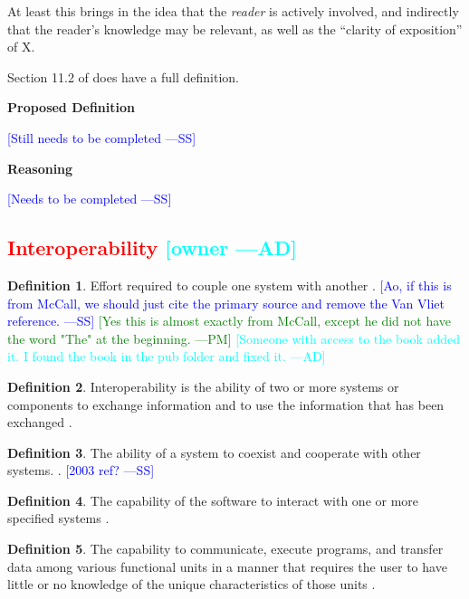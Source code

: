 \documentclass[letterpaper, cleveref]{lipics-v2019}
\newcommand{\authornote}[3]{\textcolor{#1}{[#3 ---#2]}}
\newcommand{\authornote}[3]{}
\newcommand{\wss}[1]{\authornote{blue}{SS}{#1}} %
\newcommand{\pmi}[1]{\authornote{green}{PM}{#1}} %
\newcommand{\ad}[1]{\authornote{cyan}{AD}{#1}} %
\newcommand{\notdone}[1]{\textcolor{red}{#1}}
\theoremstyle{definition}
\newtheorem{defn}{Definition}
\begin{document}
At least this brings in the idea that the \emph{reader} is actively involved,
and indirectly that the reader's knowledge may be relevant, as well as the
``clarity of exposition'' of X.

Section 11.2 of \citet{adams2015nonfunctional} does have a full definition.

\noindent \textbf{Proposed Definition}

\wss{Still needs to be completed}

\noindent \textbf{Reasoning}

\wss{Needs to be completed}


\subsection{\notdone{Interoperability} \ad{owner}}

\begin{defn}
  Effort required to couple one system with another \citep{McCallEtAl1977}.
  \wss{Ao, if this is from McCall, we should just cite the primary source
  and remove the Van Vliet reference.} \pmi{Yes this is almost exactly from
  McCall, except he did not have the word "The" at the beginning.}
  \ad{Someone with access to the book added it. I found the book in the pub
  folder and fixed it.}
\end{defn}

\begin{defn}
  Interoperability is the ability of two or more systems or components to
  exchange information and to use the information that has been exchanged
  \citep{IEEEComputerDictionary1991}.
\end{defn}

\begin{defn}
  The ability of a system to coexist and cooperate with other systems.
  \citep{ghezzi1991fundamentals}.  \wss{2003 ref?}
\end{defn}

\begin{defn}
  The capability of the software to interact with one or more specified
  systems \cite{ISO9126}. %
\end{defn}

\begin{defn}
  The capability to communicate, execute programs, and transfer data among
  various functional units in a manner that requires the user to have little
  or no knowledge of the unique characteristics of those units
  \citep{ISO/IEC/IEEE24765}. %
\end{defn}
\end{document}
